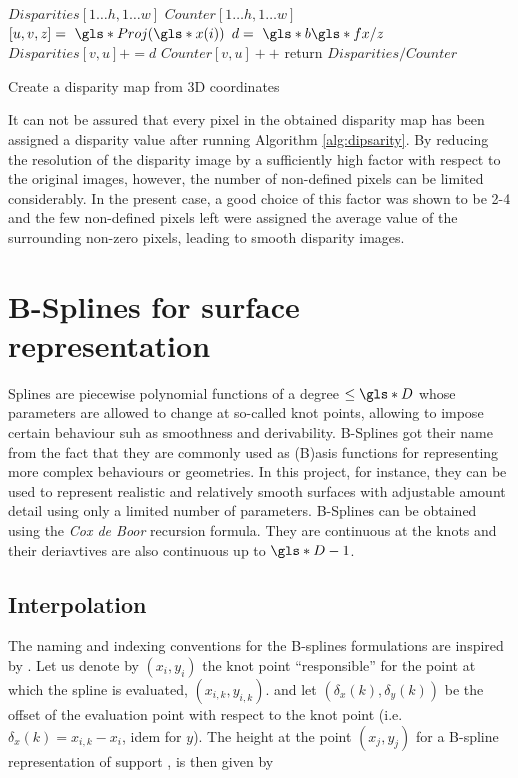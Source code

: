 \begin{algorithm}
  $Disparities[1\ldots h, 1\ldots w]$\;
  $Counter[1\ldots h, 1\ldots w]$\;
   {
    $[u,v,z] = \g{Proj}(\g{x}(i))$ \; 
    ${d} = \g{b} \g{fx} / z$ \;
    $Disparities[v,u] += d$\;
    $Counter[v,u]++$\;
  }
  return $Disparities / Counter$\;
  \caption{Create a disparity map from 3D coordinates}
  \label{alg:dipsarity}
\end{algorithm}

It can not be assured that every pixel in the obtained disparity map has been
assigned a disparity value after running Algorithm \ref{alg:dipsarity}. 
By reducing the resolution of the disparity image by a sufficiently high factor
with respect to the original images, however, the number of non-defined pixels can be
limited considerably. In the present case, a good choice of this factor was shown to be 
2-4 and the few non-defined pixels left were assigned the average
value of the surrounding non-zero pixels, leading to smooth disparity images.

\section{B-Splines for surface representation}

Splines are piecewise polynomial functions of a degree $\leq \g{D}$ whose
parameters are allowed to change at so-called knot points, allowing to impose
certain behaviour suh as smoothness and derivability. 
B-Splines got their name from the fact that they are commonly used as (B)asis
functions for representing more complex behaviours or geometries. In this
project, for instance, they can be used to represent realistic and relatively
smooth surfaces with adjustable amount detail using only a limited number of
parameters. B-Splines can be obtained using the \textit{Cox de Boor} recursion
formula. They are continuous at the knots and their deriavtives are also
continuous up to $\g{D} -1$.

\subsection{Interpolation} 

The naming and indexing conventions for the B-splines formulations are inspired by
\cite{Dominik}. Let us denote by $(x_i, y_i)$ the knot point ``responsible'' for
the point at which the spline is evaluated, $(x_{i,k}, y_{i,k})$. and let
$(\delta_x(k), \delta_y(k))$ be the offset of the evaluation point with
  respect to the knot point (i.e. $\delta_{x}(k) = x_{i,k} - x_i$, idem for $y$).
The height at the point $(x_j, y_j)$ for a B-spline representation of support 
, is then given by 

